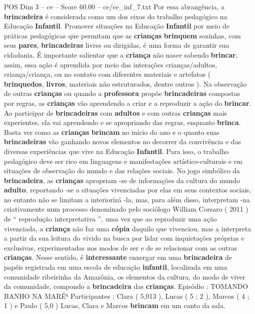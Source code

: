 \begin{textsample}{POS Dim 3 – ce – Score 60.00 – ce/ce\_inf\_7.txt}
Por essa abrangência, a \textbf{brincadeira} é considerada como um dos eixos do trabalho pedagógico na Educação \textbf{Infantil}.
Promover situações na Educação \textbf{Infantil} por meio de práticas pedagógicas que permitam que as \textbf{crianças} \textbf{brinquem} sozinhas, com seus \textbf{pares}, \textbf{brincadeiras} livres ou dirigidas, é uma forma de garantir sua cidadania.
É importante salientar que a \textbf{criança} não nasce sabendo \textbf{brincar}, assim, essa ação é aprendida por meio das interações crianças/adultos, criança/criança, ou no contato com diferentes materiais e artefatos ( \textbf{brinquedos}, \textbf{livros}, materiais não estruturados, dentre outros ).
Na observação de outras \textbf{crianças} ou quando a \textbf{professora} propõe \textbf{brincadeiras} compostas por regras, as \textbf{crianças} vão aprendendo a criar e a reproduzir a ação do \textbf{brincar}.
Ao participar de \textbf{brincadeiras} com \textbf{adultos} e com outras \textbf{crianças} mais experientes, ela vai aprendendo e se apropriando das regras, enquanto \textbf{brinca}.
Basta ver como as \textbf{crianças} \textbf{brincam} no início do ano e o quanto suas \textbf{brincadeiras} vão ganhando novos elementos no decorrer da convivência e das diversas experiências que vive na Educação \textbf{Infantil}.
Para isso, o trabalho pedagógico deve ser rico em linguagens e manifestações artístico-culturais e em situações de observação do mundo e das relações sociais.
No jogo simbólico da \textbf{brincadeira}, as \textbf{crianças} apropriam -se de informações da cultura do mundo \textbf{adulto}, reportando -se a situações vivenciadas por elas em seus contextos sociais, no entanto não se limitam a interiorizá -la, mas, para além disso, interpretam -na criativamente num processo denominado pelo sociólogo William Corsaro ( 2011 ) de “ reprodução interpretativa ”, uma vez que ao reproduzir uma ação vivenciada, a \textbf{criança} não faz uma \textbf{cópia} daquilo que vivenciou, mas a interpreta a partir da sua leitura do vivido na busca por lidar com inquietações próprias e exclusivas, experimentadas nos modos de ser e de se relacionar com as outras \textbf{crianças}.
Nesse sentido, é \textbf{interessante} enxergar em uma \textbf{brincadeira} de papéis registrada em uma escola de educação \textbf{infantil}, localizada em uma comunidade ribeirinha da Amazônia, os elementos da cultura, do modo de viver da comunidade, compondo a \textbf{brincadeira} das \textbf{crianças}.
Episódio : TOMANDO BANHO NA MARÉ⁶ Participantes : Clara ( 5,013 ), Lucas ( 5 ; 2 ), Marcos ( 4 ; 1 ) e Paulo ( 5,0 ) Lucas, Clara e Marcos \textbf{brincam} em um canto da sala.

\end{textsample}
